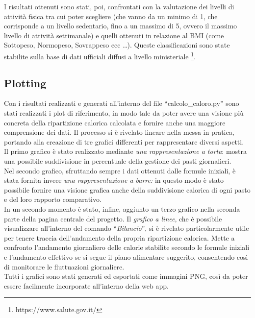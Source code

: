 \documentclass[11pt]{article}
\begin{document}
I risultati ottenuti sono stati, poi, confrontati con la valutazione dei livelli di attività fisica tra cui poter scegliere (che vanno da un minimo di 1, che corrisponde a un livello sedentario, fino a un massimo di 5, ovvero il massimo livello di attività settimanale) e quelli ottenuti in relazione al BMI (come Sottopeso, Normopeso, Sovrappeso ecc …). Queste classificazioni sono state stabilite sulla base di dati ufficiali diffusi a livello ministeriale \footnote{https://www.salute.gov.it/}. 
\subsection{Plotting} Con i risultati realizzati e generati all’interno del file “calcolo\_caloro.py” sono stati realizzati i plot di riferimento, in modo tale da poter avere una visione più concreta della ripartizione calorica calcolata e fornire anche una maggiore comprensione dei dati. Il processo si è rivelato lineare nella messa in pratica, portando alla creazione di tre grafici differenti per rappresentare diversi aspetti. \\
Il primo grafico è stato realizzato mediante\textit{ una rappresentazione a torta}: mostra una possibile suddivisione in percentuale della gestione dei pasti giornalieri. \\
Nel secondo grafico, sfruttando sempre i dati ottenuti dalle formule iniziali, è stata fornita invece \textit{una rappresentazione a barre:}  in questo modo è stato possibile fornire una visione grafica anche della suddivisione calorica di ogni pasto e del loro rapporto comparativo.\\
In un secondo momento è stato, infine, aggiunto un terzo grafico nella seconda parte della pagina centrale del progetto. Il \textit{grafico a linee}, che è possibile visualizzare all’interno del comando “\textit{Bilancio}”, si è rivelato particolarmente utile per tenere traccia dell'andamento della propria ripartizione calorica. Mette a confronto l’andamento giornaliero delle calorie stabilite secondo le formule iniziali e l’andamento effettivo se si segue il piano alimentare suggerito, consentendo così di monitorare le fluttuazioni giornaliere.\\
Tutti i grafici sono stati generati ed esportati come immagini PNG, così da poter essere facilmente incorporate all’interno della web app.
\end{document}

